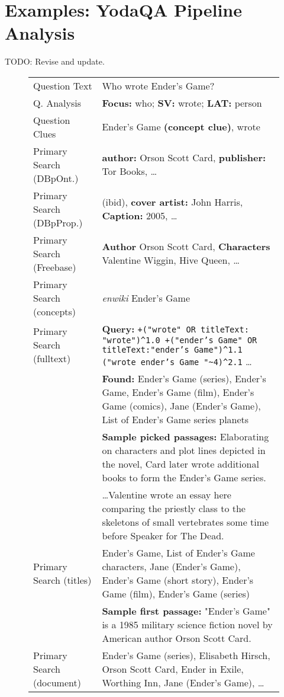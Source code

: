 \chapter{Examples: YodaQA Pipeline Analysis}
\label{app:analysis}

TODO: Revise and update.


\begin{figure}[t!]
\renewcommand{\arraystretch}{1.3}
\centering
\footnotesize
\begin{tabular}{|p{1.8cm}p{6cm}|}
\hline
Question Text & Who wrote Ender's Game? \\
Q. Analysis & \textbf{Focus:} who; \textbf{SV:} wrote; \textbf{LAT:} person \\
Question Clues & Ender's Game \textbf{(concept clue)}, wrote \\ \hline

Primary Search (DBpOnt.) & \textbf{author:} Orson Scott Card, \textbf{publisher:} Tor Books, \dots \\
Primary Search (DBpProp.) & (ibid), \textbf{cover artist:} John Harris, \textbf{Caption:} 2005, \dots \\
Primary Search (Freebase) & \textbf{Author} Orson Scott Card, \textbf{Characters} Valentine Wiggin, Hive Queen, \dots \\
Primary Search (concepts) & \textit{enwiki} Ender's Game \\
Primary Search (fulltext) %
	& \textbf{Query:} \texttt{+("wrote" OR titleText: "wrote")\^{}1.0 +("ender's Game" OR titleText:"ender's Game")\^{}1.1  ("wrote ender's Game "\textasciitilde4)\^{}2.1} \dots \\
	& \textbf{Found:} Ender's Game (series), Ender's Game, Ender's Game (film), Ender's Game (comics), Jane (Ender's Game), List of Ender's Game series planets \\
	& \textbf{Sample picked passages:} {\footnotesize Elaborating on characters and plot lines depicted in the novel, Card later wrote additional books to form the Ender's Game series.} \\
	& \dots {\footnotesize Valentine wrote an essay here comparing the priestly class to the skeletons of small vertebrates some time before Speaker for The Dead.} \\
Primary Search (titles) & Ender's Game, List of Ender's Game characters, Jane (Ender's Game), Ender's Game (short story), Ender's Game (film), Ender's Game (series) \\
	& \textbf{Sample first passage:} {\footnotesize "Ender's Game" is a 1985 military science fiction novel by American author Orson Scott Card.} \\
Primary Search (document) & Ender's Game (series), Elisabeth Hirsch, Orson Scott Card, Ender in Exile, Worthing Inn, Jane (Ender's Game), \dots \\ \hline


\end{tabular}
\end{figure}
